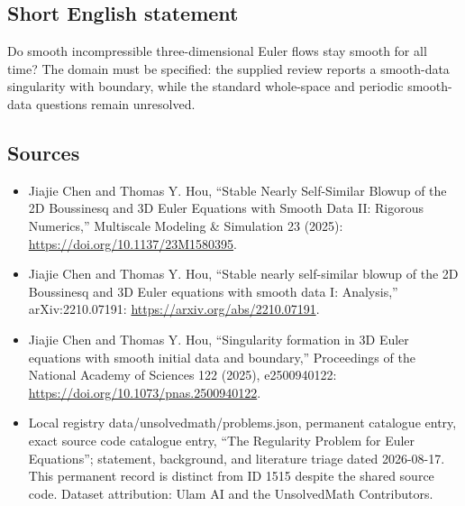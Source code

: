 \documentclass[11pt]{article}
\begin{document}
\subsection{Short English statement}
Do smooth incompressible three-dimensional Euler flows stay smooth for all time? The domain must be specified: the supplied review reports a smooth-data singularity with boundary, while the standard whole-space and periodic smooth-data questions remain unresolved.
\subsection{Sources}
\begin{itemize}
\item Jiajie Chen and Thomas Y. Hou, ``Stable Nearly Self-Similar Blowup of the 2D Boussinesq and 3D Euler Equations with Smooth Data II: Rigorous Numerics,'' Multiscale Modeling \& Simulation 23 (2025): \url{https://doi.org/10.1137/23M1580395}.
\item Jiajie Chen and Thomas Y. Hou, ``Stable nearly self-similar blowup of the 2D Boussinesq and 3D Euler equations with smooth data I: Analysis,'' arXiv:2210.07191: \url{https://arxiv.org/abs/2210.07191}.
\item Jiajie Chen and Thomas Y. Hou, ``Singularity formation in 3D Euler equations with smooth initial data and boundary,'' Proceedings of the National Academy of Sciences 122 (2025), e2500940122: \url{https://doi.org/10.1073/pnas.2500940122}.
\item Local registry data/unsolvedmath/problems.json, permanent catalogue entry, exact source code catalogue entry, ``The Regularity Problem for Euler Equations''; statement, background, and literature triage dated 2026-08-17. This permanent record is distinct from ID 1515 despite the shared source code. Dataset attribution: Ulam AI and the UnsolvedMath Contributors.
\end{itemize}
\end{document}
